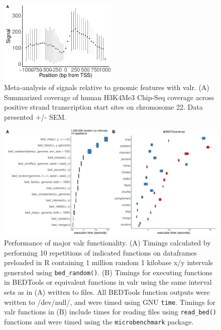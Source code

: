 \documentclass[9pt,a4paper]{extarticle}
\begin{document}

\begin{figure}[!htb]
\centering
\includegraphics[width=0.5\textwidth]{figure2.pdf}
\caption{\label{fig:Figure 2}Meta-analysis of signals relative to genomic features with valr. \textnormal{(A) Summarized coverage of human H3K4Me3 Chip-Seq coverage across positive strand transcription start sites on chromosome 22. Data presented +/- SEM.}}
\end{figure}

\begin{figure}[!htb]
\centering
\includegraphics[width=1\textwidth]{figure3.pdf}
\caption{\label{fig:Figure 3} Performance of major valr functionality. \textnormal{(A)  Timings calculated by performing 10 repetitions of indicated functions on dataframes preloaded in R containing 1 million random 1 kilobase x/y intervals generated using \texttt{bed\_random()}. (B) Timings for executing functions in BEDTools or equivalent functions in valr using the same interval sets as in (A) written to files. All BEDTools function outputs were written to /dev/null/, and were timed using GNU \texttt{time}. Timings for valr functions in (B) include times for reading files using \texttt{read\_bed()} functions and were timed using the \texttt{microbenchmark} package.}}
\end{figure}


\end{document}

